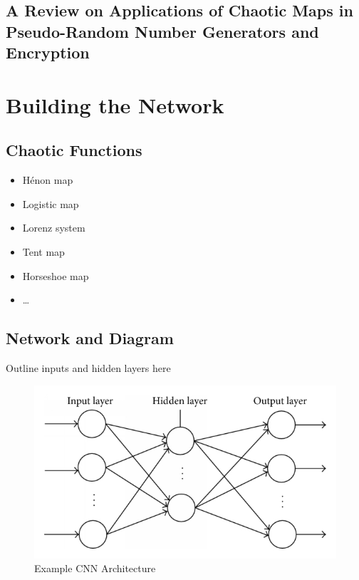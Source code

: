 \documentclass[conference]{IEEEtran}
\begin{document}
\subsection{A Review on Applications of Chaotic Maps in Pseudo-Random Number Generators and Encryption}\cite{Naik2022}

\section{Building the Network}\label{sec:building-the-network}

\subsection{Chaotic Functions}\label{subsec:chaotic-functions}

\begin{itemize}
    \item Hénon map
    \item Logistic map
    \item Lorenz system
    \item Tent map
    \item Horseshoe map
    \item \ldots
\end{itemize}

\subsection{Network and Diagram}\label{subsec:network-and-diagram}

Outline inputs and hidden layers here

\begin{figure}[!ht]
    \centering
    \includegraphics{figures/CNN}
    \caption{Example CNN Architecture}
    \label{fig:CNN}
\end{figure}
\end{document}
